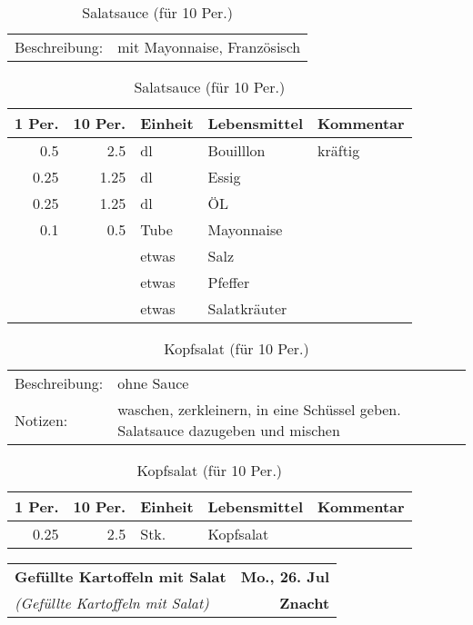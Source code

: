 \documentclass[11pt,a4paper]{article}%
\begin{document}
\begin{table}[h]%
\caption{Salatsauce (für 10 Per.)}%
\begin{tabularx}{\textwidth}{l X}%
Beschreibung: & mit Mayonnaise, Französisch\\%
\end{tabularx}%
\par%
\begin{tabularx}{\textwidth}{| r | r | l | l | X |}%
\hline%
\tiny{1 Per.}&\tiny{10 Per.}&\tiny{Einheit}&\tiny{Lebensmittel}&\tiny{Kommentar}\\%
\hline%
0.5&2.5&dl&Bouilllon&kräftig\\%
\hline%
0.25&1.25&dl&Essig&\\%
\hline%
0.25&1.25&dl&ÖL&\\%
\hline%
0.1&0.5&Tube&Mayonnaise&\\%
\hline%
&&etwas&Salz&\\%
\hline%
&&etwas&Pfeffer&\\%
\hline%
&&etwas&Salatkräuter&\\%
\hline%
\end{tabularx}%
\end{table}

%
\vspace{0.75cm}%
\renewcommand{\arraystretch}{1.25}%


\begin{table}[h]%
\caption{Kopfsalat (für 10 Per.)}%
\begin{tabularx}{\textwidth}{l X}%
Beschreibung: &ohne Sauce\\%
Notizen:&waschen, zerkleinern, in eine Schüssel geben. Salatsauce dazugeben und mischen\\%
\end{tabularx}%
\par%
\begin{tabularx}{\textwidth}{| r | r | l | l | X |}%
\hline%
\tiny{1 Per.}&\tiny{10 Per.}&\tiny{Einheit}&\tiny{Lebensmittel}&\tiny{Kommentar}\\%
\hline%
0.25&2.5&Stk.&Kopfsalat&\\%
\hline%
\end{tabularx}%
\end{table}

%
\clearpage%
\pagebreak%
\renewcommand{\arraystretch}{1.75}%
%
%


\begin{table}%
\begin{tabularx}{\textwidth}{X r}%
\LARGE \textbf{Gefüllte Kartoffeln mit Salat}&\color{gray} \large \textbf{Mo., 26. Jul}\\%
\small \textit{(Gefüllte Kartoffeln mit Salat)}&\color{gray} \large \textbf{Znacht}\\%
\hline%
\end{tabularx}%
\end{table}
\end{document}
